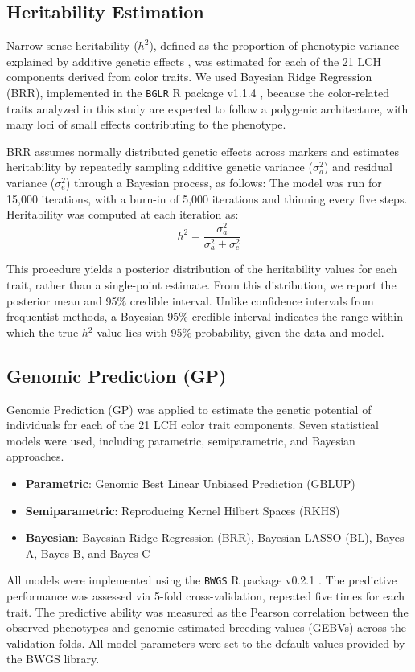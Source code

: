 \documentclass[pdflatex,sn-mathphys-ay]{sn-jnl}%
\begin{document}
\subsection{Heritability Estimation}
Narrow-sense heritability ($h^2$), defined as the proportion of phenotypic variance explained by additive genetic effects \citep{Campos2015}, was estimated for each of the 21 LCH components derived from color traits. We used Bayesian Ridge Regression (BRR), implemented in the \texttt{BGLR} R package v1.1.4 \citep{Campos2014}, because the color-related traits analyzed in this study are expected to follow a polygenic architecture, with many loci of small effects contributing to the phenotype.

BRR assumes normally distributed genetic effects across markers and estimates heritability by repeatedly sampling additive genetic variance ($\sigma_{a}^{2}$) and residual variance ($\sigma_{e}^{2}$) through a Bayesian process, as follows: The model was run for 15,000 iterations, with a burn-in of 5,000 iterations and thinning every five steps. Heritability was computed at each iteration as:\\
\[
h^2=\dfrac{\sigma_{a}^{2}}{\sigma_{a}^{2}+\sigma_{e}^{2}}
\]

This procedure yields a posterior distribution of the heritability values for each trait, rather than a single-point estimate. From this distribution, we report the posterior mean and 95\% credible interval. Unlike confidence intervals from frequentist methods, a Bayesian 95\% credible interval indicates the range within which the true $h{{}^2}$ value lies with 95\% probability, given the data and model.

\subsection{Genomic Prediction (GP)}
Genomic Prediction (GP) was applied to estimate the genetic potential of individuals for each of the 21 LCH color trait components. Seven statistical models were used, including parametric, semiparametric, and Bayesian approaches.
\begin{itemize}
\item \textbf{Parametric}: Genomic Best Linear Unbiased Prediction (GBLUP)
\item \textbf{Semiparametric}: Reproducing Kernel Hilbert Spaces (RKHS)
\item \textbf{Bayesian}: Bayesian Ridge Regression (BRR), Bayesian LASSO (BL), Bayes A, Bayes B, and Bayes C
\end{itemize}
All models were implemented using the \texttt{BWGS} R package v0.2.1 \citep{Charmet2020}. The predictive performance was assessed via 5-fold cross-validation, repeated five times for each trait. The predictive ability was measured as the Pearson correlation between the observed phenotypes and genomic estimated breeding values (GEBVs) across the validation folds. All model parameters were set to the default values provided by the BWGS library.
\end{document}
